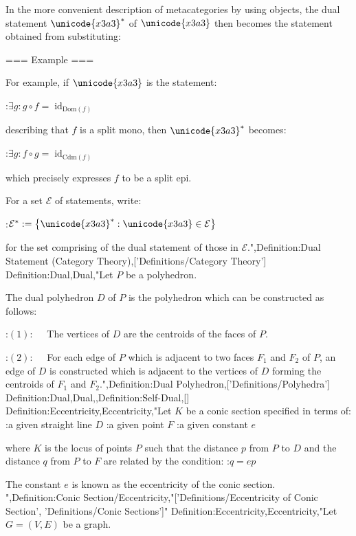 In the more convenient description of metacategories by using objects, the dual statement $\unicode{x3a3}^*$ of $\unicode{x3a3}$ then becomes the statement obtained from substituting:









=== Example ===

For example, if $\unicode{x3a3}$ is the statement:

:$\exists g: g \circ f = \operatorname{id}_{\mathrm {Dom} \left( f \right)}$

describing that $f$ is a split mono, then $\unicode{x3a3}^*$ becomes:

:$\exists g: f \circ g = \operatorname{id}_{\mathrm {Cdm} \left( f \right)}$

which precisely expresses $f$ to be a split epi.


For a set $\mathcal E$ of statements, write:

:$\mathcal E^* := \left\lbrace \unicode{x3a3}^*: \unicode{x3a3} \in \mathcal E \right\rbrace$ 

for the set comprising of the dual statement of those in $\mathcal E$.",Definition:Dual Statement (Category Theory),['Definitions/Category Theory']
Definition:Dual,Dual,"Let $P$ be a polyhedron.

The dual polyhedron $D$ of $P$ is the polyhedron which can be constructed as follows:

:$(1): \quad$ The vertices of $D$ are the centroids of the faces of $P$.

:$(2): \quad$ For each edge of $P$ which is adjacent to two faces $F_1$ and $F_2$ of $P$, an edge of $D$ is constructed which is adjacent to the vertices of $D$ forming the centroids of $F_1$ and $F_2$.",Definition:Dual Polyhedron,['Definitions/Polyhedra']
Definition:Dual,Dual,,Definition:Self-Dual,[]
Definition:Eccentricity,Eccentricity,"Let $K$ be a conic section specified in terms of:
:a given straight line $D$
:a given point $F$
:a given constant $e$

where $K$ is the locus of points $P$ such that the distance $p$ from $P$ to $D$ and the distance $q$ from $P$ to $F$ are related by the condition:
:$q = e p$


The constant $e$ is known as the eccentricity of the conic section.
",Definition:Conic Section/Eccentricity,"['Definitions/Eccentricity of Conic Section', 'Definitions/Conic Sections']"
Definition:Eccentricity,Eccentricity,"Let $G = \left( V, E \right)$ be a graph.


